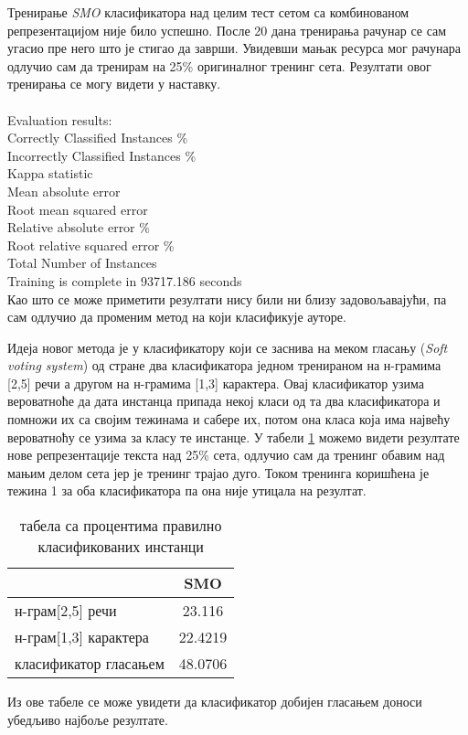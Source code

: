 \documentclass[11pt]{article}
\begin{document}
Тренирање \emph{SMO} класификатора над целим тест сетом са комбинованом репрезентацијом није било успешно. После 20 дана тренирања рачунар се сам угасио пре него што је стигао да заврши. Увидевши мањак ресурса мог рачунара одлучио сам да тренирам на 25\% оригиналног тренинг сета. Резултати овог тренирања се могу видети у наставку.\\\\
Evaluation results:\\
Correctly Classified Instances          \%\\
Incorrectly Classified Instances        \%\\
Kappa statistic               \\
Mean absolute error            \\
Root mean squared error      \\
Relative absolute error          \%\\
Root relative squared error      \%\\
Total Number of Instances      \\
Training is complete in 93717.186 seconds\\

Као што се може приметити резултати нису били ни близу задовољавајући, па сам одлучио да променим метод на који класификује ауторе.

Идеја новог метода је у класификатору који се заснива на меком гласању (\emph{Soft voting system}) од стране два класификатора једном тренираном на н-грамима [2,5] речи а другом на н-грамима [1,3] карактера. Овај класификатор узима вероватноће да дата инстанца припада некој класи од та два класификатора и помножи их са својим тежинама и сабере их, потом она класа која има највећу вероватноћу се узима за класу те инстанце.
\newpage
У табели \ref{tab1} можемо видети резултате нове репрезентације текста над 25\% сета, одлучио сам да тренинг обавим над мањим делом сета јер је тренинг трајао дуго. Током тренинга коришћена је тежина 1 за оба класификатора па она није утицала на резултат.

\begin{table}[h]
\centering
\begin{tabular}{|l||c|}
\hline
&SMO \\ \hline
н-грам[2,5] речи & 23.116 \\ \hline
н-грам[1,3] карактера & 22.4219 \\ \hline
класификатор гласањем & 48.0706 \\ \hline
\end{tabular}
\caption{табела са процентима правилно класификованих инстанци}\label{tab1}
\end{table}
Из ове табеле се може увидети да класификатор добијен гласањем доноси убедљиво најбоље резултате.
\end{document}
